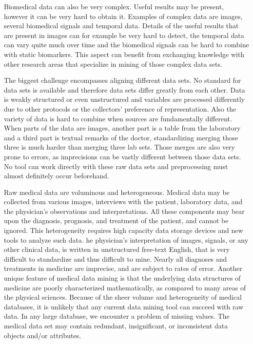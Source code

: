 \documentclass[10pt,a4paper]{article}
\begin{document}
	Biomedical data can also be very complex. Useful results may be present, however it can be very hard to obtain it. Examples of complex data are images, several biomedical signals and temporal data. Details of the useful results that are present in images can for example be very hard to detect, the temporal data can vary quite much over time and the biomedical signals can be hard to combine with static biomarkers. This aspect can benefit from exchanging knowledge with other research areas that specialize in mining of those complex data sets. \cite{Turkay2014, bellazzi2011data}
	
	The biggest challenge encompasses aligning different data sets. No standard for data sets is available and therefore data sets differ greatly from each other. Data is weakly structured or even unstructured \cite{Holzinger2014} and variables are processed differently due to other protocols or the collectors' preference of representation.\cite{Otasek2014} Also the variety of data is hard to combine when sources are fundamentally different. When parts of the data are images, another part is a table from the laboratory and a third part is textual remarks of the doctor, standardizing merging those three is much harder than merging three lab sets. Those merges are also very prone to errors, as imprecisions can be vastly different between those data sets. No tool can work directly with these raw data sets and preprocessing must almost definitely occur beforehand.\cite{CIOS20021, Turkay2014}
	
	
	Raw medical data are voluminous and heterogeneous. Medical data may be collected from various images, interviews with the patient, laboratory data, and the physician’s observations and interpretations. All these components may bear upon the diagnosis, prognosis, and treatment of the patient, and cannot be ignored.  This heterogeneity requires high capacity data storage devices and new tools to analyze such data. he physician’s interpretation of images, signals, or any other clinical data, is written in unstructured free-text English, that is very difficult to standardize and thus difficult to mine. Nearly all diagnoses and treatments in medicine are imprecise, and are subject to rates of error. Another unique feature of medical data mining is that the underlying data structures of medicine are poorly characterized mathematically, as compared to many areas of the physical sciences. Because of the sheer volume and heterogeneity of medical databases, it is unlikely that any current data mining tool can succeed with raw data. In any large database, we encounter a problem of missing values. The medical data set may contain redundant, insignificant, or inconsistent data objects and/or attributes. \cite{CIOS20021}
	
\end{document}

